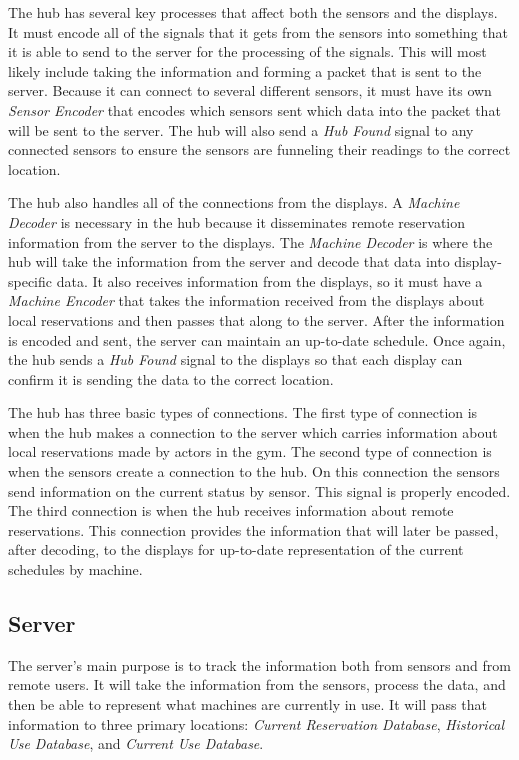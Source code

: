 \documentclass[PPFS.tex]{template/subfiles}
\newcommand{\sn}[1]{\textit{#1}}
\begin{document}
The hub has several key processes that affect both the sensors and the displays. It must encode all of the signals that it gets from the sensors into something that it is able to send to the server for the processing of the signals. This will most likely include taking the information and forming a packet that is sent to the server. Because it can connect to several different sensors, it must have its own \sn{Sensor Encoder} that encodes which sensors sent which data into the packet that will be sent to the server. The hub will also send a \sn{Hub Found} signal to any connected sensors to ensure the sensors are funneling their readings to the correct location.

The hub also handles all of the connections from the displays. A \sn{Machine Decoder} is necessary in the hub because it disseminates remote reservation information from the server to the displays. The \sn{Machine Decoder} is where the hub will take the information from the server and decode that data into display-specific data. It also receives information from the displays, so it must have a \sn{Machine Encoder} that takes the information received from the displays about local reservations and then passes that along to the server. After the information is encoded and sent, the server can maintain an up-to-date schedule. Once again, the hub sends a \sn{Hub Found} signal to the displays so that each display can confirm it is sending the data to the correct location.

The hub has three basic types of connections. The first type of connection is when the hub makes a connection to the server which carries information about local reservations made by actors in the gym. The second type of connection is when the sensors create a connection to the hub. On this connection the sensors send information on the current status by sensor. This signal is properly encoded. The third connection is when the hub receives information about remote reservations. This connection provides the information that will later be passed, after decoding, to the displays for up-to-date representation of the current schedules by machine.

\subsection{Server}

The server's main purpose is to track the information both from sensors and from remote users. It will take the information from the sensors, process the data, and then be able to represent what machines are currently in use. It will pass that information to three primary locations: \sn{Current Reservation Database}, \sn{Historical Use Database}, and \sn{Current Use Database}.
\end{document}
